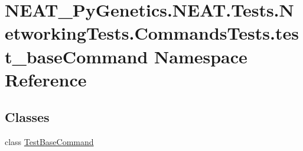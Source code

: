 \hypertarget{namespaceNEAT__PyGenetics_1_1NEAT_1_1Tests_1_1NetworkingTests_1_1CommandsTests_1_1test__baseCommand}{}\section{N\+E\+A\+T\+\_\+\+Py\+Genetics.\+N\+E\+A\+T.\+Tests.\+Networking\+Tests.\+Commands\+Tests.\+test\+\_\+base\+Command Namespace Reference}
\label{namespaceNEAT__PyGenetics_1_1NEAT_1_1Tests_1_1NetworkingTests_1_1CommandsTests_1_1test__baseCommand}
\subsection*{Classes}
\begin{DoxyCompactItemize}
\item 
class \hyperlink{classNEAT__PyGenetics_1_1NEAT_1_1Tests_1_1NetworkingTests_1_1CommandsTests_1_1test__baseCommand_1_1TestBaseCommand}{Test\+Base\+Command}
\end{DoxyCompactItemize}
